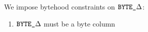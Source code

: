 We impose bytehood constraints on $\texttt{BYTE}\texttt{\_$\Delta$}$:
\begin{enumerate}
	\item $\texttt{BYTE}\texttt{\_$\Delta$}$ must be a byte column
\end{enumerate}
